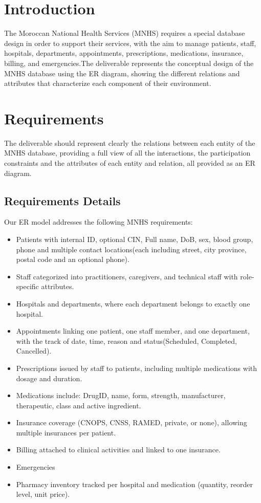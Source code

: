 \documentclass[a4paper,12pt]{article}
\begin{document}
\section{Introduction}
The Moroccan National Health Services (MNHS) requires a special database design in order to support their services, with the aim to manage patients, staff, hospitals, departments, appointments, prescriptions, medications, insurance, billing, and emergencies.The deliverable represents the conceptual design of the MNHS database using the ER diagram, showing the different relations and attributes that characterize each component of their environment. 

\section{Requirements}
The deliverable should represent clearly the relations between each  entity of the MNHS database, providing a full view of all the interactions, the participation constraints and the attributes of each entity and relation, all provided as an ER diagram.
\subsection{Requirements Details}
Our ER model addresses the following MNHS requirements:
\begin{itemize}
    \item Patients with internal ID, optional CIN, Full name, DoB, sex, blood group, phone and multiple contact locations(each including street, city province, postal code and an optional phone).
    \item Staff categorized into practitioners, caregivers, and technical staff with role-specific attributes.
    \item Hospitals and departments, where each department belongs to exactly one hospital.
    \item Appointments linking one patient, one staff member, and one department, with the track of date, time, reason and status(Scheduled, Completed, Cancelled).
    \item Prescriptions issued by staff to patients, including multiple medications with dosage and duration.
    \item Medications include: DrugID, name, form, strength, manufacturer, therapeutic, class and active ingredient.
    \item Insurance coverage (CNOPS, CNSS, RAMED, private, or none), allowing multiple insurances per patient.
    \item Billing attached to clinical activities and linked to one insurance.
    \item Emergencies 
    \item Pharmacy inventory tracked per hospital and medication (quantity, reorder level, unit price).
\end{itemize}
\newpage
\end{document}
